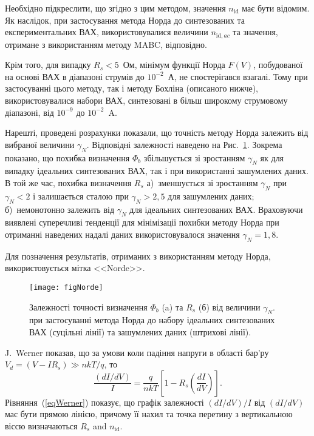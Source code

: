 \documentclass[a4paper,14pt,oneside,openany]{memoir}
\begin{document}
Необхідно підкреслити, що згідно з цим методом, значення $n_\mathrm{id}$ має бути відомим.
Як наслідок, при застосування метода Норда до синтезованих та експериментальних ВАХ, використовувалися величини $n_{\mathrm{id},ac}$ та значення, отримане з використанням методу MABC, відповідно.

Крім того, для випадку  $R_s<5$~Ом, мінімум функції Норда $F(V)$, побудованої на основі ВАХ в діапазоні струмів до $10^{-2}$~А, не спостерігався взагалі.
Тому при застосуванні цього методу, так і методу Бохліна (описаного нижче), використовувалися набори ВАХ, синтезовані в більш широкому струмовому діапазоні, від $10^{-9}$ до $10^{-2}$~A.

Нарешті, проведені розрахунки показали, що точність методу Норда залежить від вибраної величини $\gamma_N$.
Відповідні залежності наведено на Рис.~\ref{figNorde}.
Зокрема показано, що похибка визначення $\Phi_b$ збільшується зі зростанням $\gamma_N$ як для випадку ідеальних синтезованих ВАХ, так і при використанні зашумлених даних.
В той же час, похибка визначення  $R_s$
а)~зменшується зі зростанням $\gamma_N$ при $\gamma_N<2$ і залишається сталою при $\gamma_N>2,5$ для зашумлених даних;
б)~немонотонно залежить від $\gamma_N$ для ідеальних синтезованих ВАХ.
Враховуючи виявлені суперечливі тенденції для мінімізації похибки методу Норда при отриманні наведених надалі даних використовувалося значення $\gamma_N=1,8$.

Для позначення результатів, отриманих з використанням методу Норда, використовується мітка <<Norde>>.

\begin{figure}
\center
\texttt{[image: figNorde]}%
\caption{\label{figNorde}
Залежності точності визначення $\Phi_b$ (a) та $R_s$ (б)  від величини $\gamma_N$.
 при застосуванні метода Норда до набору ідеальних синтезованих ВАХ (суцільні лінії) та зашумлених даних (штрихові лінії).
}
\end{figure}

J.~Werner  \cite{Werner} показав, що за умови коли падіння напруги в області бар'ру $V_d=(V-IR_s)\gg nkT/q$, то
\begin{equation}
\label{eqWerner}
\frac{(dI/dV)}{I}=\frac{q}{nkT}\left[1-R_s\left(\frac{dI}{dV}\right)\right].
\end{equation}
Рівняння~(\ref{eqWerner}) показує, що графік  залежності   $(dI/dV)/I$  від $(dI/dV)$ має бути прямою лінією,
причому її нахил та точка перетину з вертикальною віссю визначаються $R_s$ and $n_\mathrm{id}$.
\end{document}
